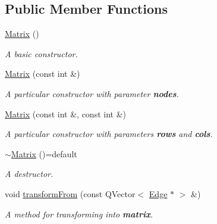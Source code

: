 \subsection*{Public Member Functions}
\begin{DoxyCompactItemize}
\item 
\mbox{\label{class_matrix_a2dba13c45127354c9f75ef576f49269b}} 
\mbox{\hyperlink{class_matrix_a2dba13c45127354c9f75ef576f49269b}{Matrix}} ()
\begin{DoxyCompactList}\small\item\em A {\itshape basic} {\itshape constructor}. \end{DoxyCompactList}\item 
\mbox{\label{class_matrix_ac0f8a0cac9a96e98edd08859d0351f3a}} 
\mbox{\hyperlink{class_matrix_ac0f8a0cac9a96e98edd08859d0351f3a}{Matrix}} (const int \&)
\begin{DoxyCompactList}\small\item\em A particular {\itshape constructor} with parameter {\bfseries{nodes}}. \end{DoxyCompactList}\item 
\mbox{\label{class_matrix_a4eeb3485a9e9031e64bbe647d1fcc603}} 
\mbox{\hyperlink{class_matrix_a4eeb3485a9e9031e64bbe647d1fcc603}{Matrix}} (const int \&, const int \&)
\begin{DoxyCompactList}\small\item\em A particular {\itshape constructor} with parameters {\bfseries{rows}} and {\bfseries{cols}}. \end{DoxyCompactList}\item 
\mbox{\label{class_matrix_ae55dd75e64afeef9a48ddfa3b333b60b}} 
\mbox{\hyperlink{class_matrix_ae55dd75e64afeef9a48ddfa3b333b60b}{$\sim$\+Matrix}} ()=default
\begin{DoxyCompactList}\small\item\em A {\itshape destructor}. \end{DoxyCompactList}\item 
\mbox{\label{class_matrix_a9d1bbfe5aeba7a9ddd26f62d10366052}} 
void \mbox{\hyperlink{class_matrix_a9d1bbfe5aeba7a9ddd26f62d10366052}{transform\+From}} (const Q\+Vector$<$ \mbox{\hyperlink{class_edge}{Edge}} $\ast$ $>$ \&)
\begin{DoxyCompactList}\small\item\em A {\itshape method} for transforming into {\bfseries{matrix}}. \end{DoxyCompactList}\item 

\end{DoxyCompactItemize}
